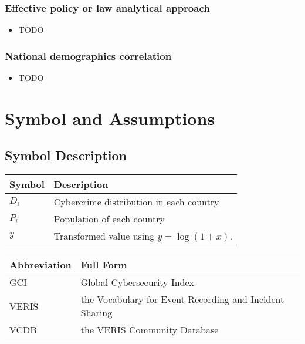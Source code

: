 \documentclass[12pt]{article}
\begin{document}
		\subsubsection[]{Effective policy or law analytical approach} %
			\begin{itemize}
				\item TODO %
			\end{itemize}
		\subsubsection[]{National demographics correlation} %
			\begin{itemize}
				\item TODO %
			\end{itemize}
	
\section{Symbol and Assumptions}\label{sec:symbol-and-assumptions} %
	\subsection{Symbol Description}\label{subsec:symbol-description} %
		\begin{tabular}{ll}
			\textbf{Symbol} & \textbf{Description} \\
			\hline
			$D_i$ & Cybercrime distribution in each country \\
			\hline
			$P_i$ & Population of each country \\
			\hline
			$y$   & Transformed value using \( y = \log(1 + x) \). \\
			\hline
		\end{tabular}

		\medskip

		\noindent
		\begin{tabular}{ll}
			\textbf{Abbreviation} & \textbf{Full Form} \\
			\hline
			GCI   & Global Cybersecurity Index \\
			\hline
			VERIS & the Vocabulary for Event Recording and Incident Sharing \\
			\hline
			VCDB  & the VERIS Community Database \\
			\hline
		\end{tabular}
\end{document}
